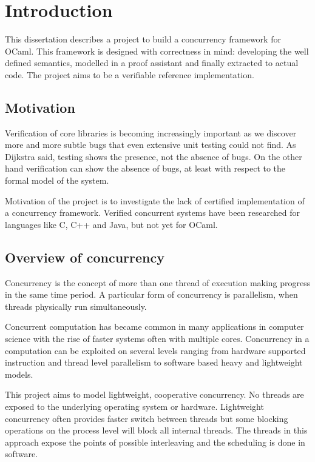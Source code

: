 \documentclass[12pt,twoside,notitlepage]{report}
\begin{document}
\cleardoublepage        %

\setcounter{page}{1}
\pagestyle{headings}
\chapter{Introduction}

This dissertation describes a project to build a concurrency framework for OCaml. This framework is designed with correctness in mind: developing the well defined semantics, modelled in a proof assistant and finally extracted to actual code. The project aims to be a verifiable reference implementation. 

\section{Motivation}
Verification of core libraries is becoming increasingly important as we discover more and more subtle bugs that even extensive unit testing could not find. As Dijkstra said, testing shows the presence, not the absence of bugs. On the other hand verification can show the absence of bugs, at least with respect to the formal model of the system.

Motivation of the project is to investigate the lack of certified implementation of a concurrency framework. Verified concurrent systems have been researched for languages like C\cite{sevvcik2011relaxed}, C++ and Java\cite{lochbihler2012machine}, but not yet for OCaml. 

\section{Overview of concurrency}
Concurrency is the concept of more than one thread of execution making progress in the same time period. A particular form of concurrency is parallelism, when threads physically run simultaneously.

Concurrent computation has became common in many applications in computer science with the rise of faster systems often with multiple cores. Concurrency in a computation can be exploited on several levels ranging from hardware supported instruction and thread level parallelism to software based heavy and lightweight models. 

This project aims to model lightweight, cooperative concurrency. No threads are exposed to the underlying operating system or hardware. Lightweight concurrency often provides faster switch between threads  but some blocking operations on the process level will block all internal threads. The threads in this approach expose the points of possible interleaving and the scheduling is done in software.
\end{document}
